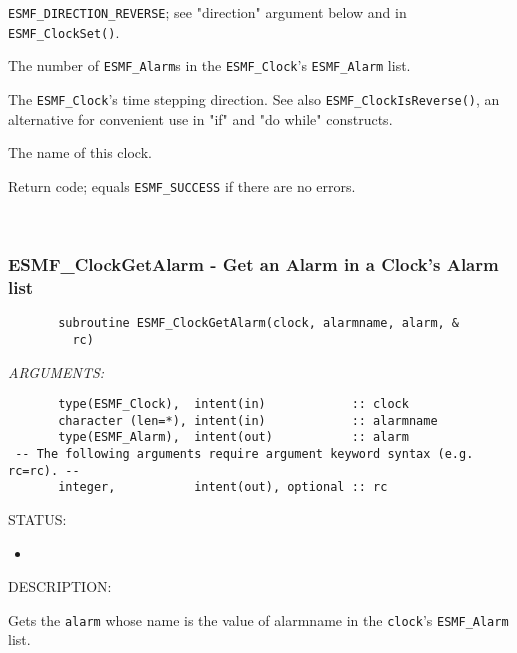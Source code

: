 \begin{description}
\begin{sloppypar}
            {\tt ESMF\_DIRECTION\_REVERSE}; see "direction" argument below and
            in {\tt ESMF\_ClockSet()}.
            \end{sloppypar}
       \item[{[alarmCount]}]
            The number of {\tt ESMF\_Alarm}s in the {\tt ESMF\_Clock}'s
            {\tt ESMF\_Alarm} list.
       \item[{[direction]}]
            The {\tt ESMF\_Clock}'s time stepping direction.  See also
            {\tt ESMF\_ClockIsReverse()}, an alternative for convenient use in
            "if" and "do while" constructs.
       \item[{[name]}]
            The name of this clock.
       \item[{[rc]}]
            Return code; equals {\tt ESMF\_SUCCESS} if there are no errors.
       \end{description}
   
 
\mbox{}\hrulefill\ 
 
\subsubsection [ESMF\_ClockGetAlarm] {ESMF\_ClockGetAlarm - Get an Alarm in a Clock's Alarm list}


 
\begin{verbatim}       subroutine ESMF_ClockGetAlarm(clock, alarmname, alarm, &
         rc)
 \end{verbatim}{\em ARGUMENTS:}
\begin{verbatim}       type(ESMF_Clock),  intent(in)            :: clock
       character (len=*), intent(in)            :: alarmname
       type(ESMF_Alarm),  intent(out)           :: alarm
 -- The following arguments require argument keyword syntax (e.g. rc=rc). --
       integer,           intent(out), optional :: rc
 \end{verbatim}
{\sf STATUS:}
   \begin{itemize}
   \item{}
   \end{itemize}
  
{\sf DESCRIPTION:\\ }


       Gets the {\tt alarm} whose name is the value of alarmname in the
       {\tt clock}'s {\tt ESMF\_Alarm} list.
  
